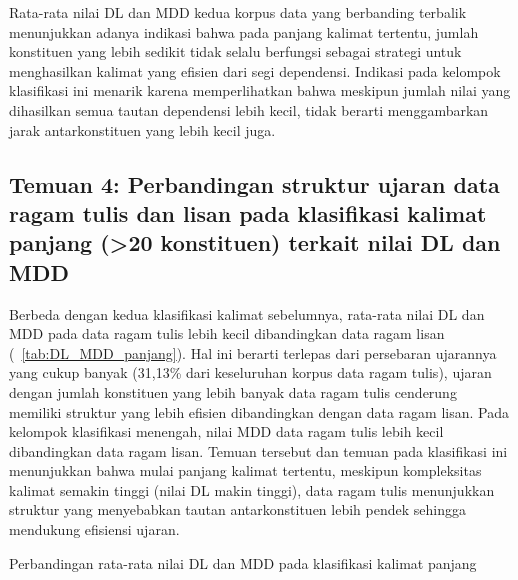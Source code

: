 Rata-rata nilai DL dan MDD kedua korpus data yang berbanding terbalik menunjukkan adanya indikasi bahwa pada panjang kalimat tertentu, jumlah konstituen yang lebih sedikit tidak selalu berfungsi sebagai strategi untuk menghasilkan kalimat yang efisien dari segi dependensi. Indikasi pada kelompok klasifikasi ini menarik karena memperlihatkan bahwa meskipun jumlah nilai yang dihasilkan semua tautan dependensi lebih kecil, tidak berarti menggambarkan jarak antarkonstituen yang lebih kecil juga.

\subsection{Temuan 4: Perbandingan struktur ujaran data ragam tulis dan lisan pada klasifikasi kalimat panjang (\textgreater20 konstituen) terkait nilai DL dan MDD}

Berbeda dengan kedua klasifikasi kalimat sebelumnya, rata-rata nilai DL dan MDD pada data ragam tulis lebih kecil dibandingkan data ragam lisan (\tab~\ref{tab:DL_MDD_panjang}). Hal ini berarti terlepas dari persebaran ujarannya yang cukup banyak (31,13\% dari keseluruhan korpus data ragam tulis), ujaran dengan jumlah konstituen yang lebih banyak data ragam tulis cenderung memiliki struktur yang lebih efisien dibandingkan dengan data ragam lisan. Pada kelompok klasifikasi menengah, nilai MDD data ragam tulis lebih kecil dibandingkan data ragam lisan. Temuan tersebut dan temuan pada klasifikasi ini menunjukkan bahwa mulai panjang kalimat tertentu, meskipun kompleksitas kalimat semakin tinggi (nilai DL makin tinggi), data ragam tulis menunjukkan struktur yang menyebabkan tautan antarkonstituen lebih pendek sehingga mendukung efisiensi ujaran.

\begin{center}
 \label{table:DL_MDD_panjang}
 \caption{Perbandingan rata-rata nilai DL dan MDD pada klasifikasi kalimat panjang}
  \begin{tabular}{ | l | l |}
    \hline
    \hline
  \end{tabular}
\end{center}

